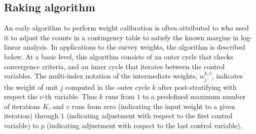 \subsection{Raking algorithm}
\label{subsec:raking:algorithm}

An early algorithm to perform weight calibration is often attributed to
\citet{deming:stephan:1940} who used it to adjust the counts in a contingency
table to satisfy the known margins in log-linear analysis.
In applications to the survey weights, the algorithm is described below.
At a basic level, this algorithm consists of an outer cycle that checks
convergence criteria, and an inner cycle that iterates between the control 
variables. The multi-index notation of the intermediate weights,
$w_j^{k,v}$, indicates the weight of unit $j$ computed in the outer cycle $k$
after post-stratifying with respect the $v$-th variable. Thus $k$ runs from $1$
to a predefined maximum number of iterations $K$, and $v$ runs from zero
(indicating the input weight to a given iteration) through $1$ (indicating
adjustment with respect to the first control variable) to $p$ (indicating 
adjustment with respect to the last control variable).

